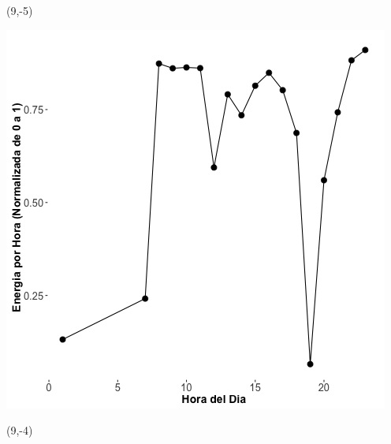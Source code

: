 \documentclass{article}\usepackage[]{graphicx}\usepackage[]{color}
\newenvironment{knitrout}{}{} %
\begin{document}
 \begin{textblock}{1}(9,-5)
\begin{minipage}{20em}
\begingroup

\endgroup
\end{minipage}
\end{textblock}

\begin{knitrout}
\color{fgcolor}
\includegraphics[scale=0.65]{figure/A21_plot_norm_median} 
\end{knitrout}


 \begin{textblock}{1}(9,-4)
\begin{minipage}{20em}
\begingroup

\endgroup
\end{minipage}
\end{textblock}
\end{document}
